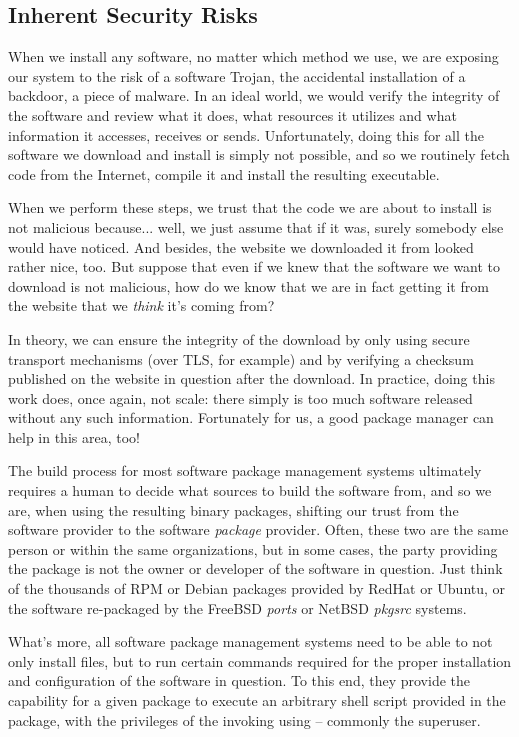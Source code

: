 \subsection{Inherent Security Risks}
\label{software-installation:package-management:security-risks}

When we install any software, no matter which method
we use, we are exposing our system to the risk of a
software Trojan, the accidental installation of a
backdoor, a piece of malware.  In an
ideal world, we would verify the integrity of the
software and review what it does, what resources it
utilizes and what information it accesses, receives or
sends.  Unfortunately, doing this for all the software
we download and install is simply not possible, and so
we routinely fetch code from the Internet, compile it
and install the resulting executable.

When we perform these steps, we trust that the code we
are about to install is not malicious because... well,
we just assume that if it was, surely somebody else
would have noticed.  And besides, the website we
downloaded it from looked rather nice, too.  But
suppose that even if we knew that the software we want
to download is not malicious, how do we know that we
are in fact getting it from the website that we {\em
think} it's coming from?

In theory, we can ensure the integrity of the download
by only using secure transport mechanisms (over TLS,
for example) and by verifying a checksum published on
the website in question after the download.  In
practice, doing this work does, once again, not scale:
there simply is too much software released without any
such information.  Fortunately for us, a good package
manager can help in this area, too!

The build process for most software package management
systems ultimately requires a human to decide what
sources to build the software from, and so we are,
when using the resulting binary packages, shifting our
trust from the software provider to the software {\em
package} provider.  Often, these two are the same
person or within the same organizations, but in some
cases, the party providing the package is not the
owner or developer of the software in question.  Just
think of the thousands of RPM or Debian packages
provided by RedHat or
Ubuntu, or the software re-packaged by
the FreeBSD {\em ports} or NetBSD {\em pkgsrc}
systems.

What's more, all software package management systems
need to be able to not only install files, but to run
certain commands required for the proper installation
and configuration of the software in question.  To
this end, they provide the capability for a given
package to execute an arbitrary shell script provided
in the package, with the privileges of the invoking
using -- commonly the superuser.

